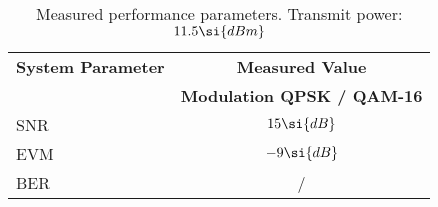 \begin{table}[htbp]
  \centering
  \caption{Measured performance parameters. Transmit power: $\measPWR \si{dBm}$}
    \begin{tabular}{lc}
    \rowcolor[rgb]{ 0,  0,  0} \textcolor[rgb]{ 1,  1,  1}{\textbf{System Parameter}}	& \textcolor[rgb]{ 1,  1,  1}{\textbf{Measured Value}} 		\\
    \rowcolor[rgb]{ 0,  0,  0} \textcolor[rgb]{ 1,  1,  1}{} & \textcolor[rgb]{ 1,  1,  1}{\textbf{Modulation QPSK / QAM-16}}					\\

    	SNR														& $\measSNRGood\si{dB}$						\\
    	EVM 													& $\measEVMGood \si{dB}$						\\
    	BER			 											& \measBERQPSKGood / \measBERQAMGood		\\
 \end{tabular}
  \label{tab:meas_params_good}
\end{table}